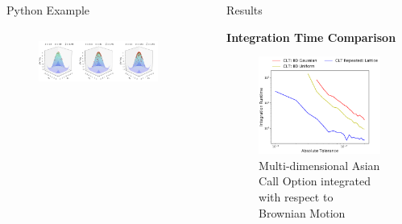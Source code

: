 \documentclass[final]{beamer}
\newcommand{\bfCenter}[1]{\centerline{\textbf{#1}}}
\newlength{\sepwid}
\newlength{\onecolwid}
\newlength{\twocolwid}
\newlength{\threecolwid}
\begin{document}
\begin{frame}[t]
\begin{columns}[t]
\begin{column}{\threecolwid}
\begin{column}{\threecolwid}\vspace{-.8in}
\begin{block}{Python Example}
    \begin{column}{\onecolwid}
        
    \end{column}
    \begin{column}{\twocolwid}
        \begin{figure}
            \includegraphics[width=0.98\textwidth]{Images/Three_3d_SurfaceScatters.png}
        \end{figure}
    \end{column}
\end{block}
\end{column}
\end{column}

\begin{column}{\sepwid}\end{column}
\begin{column}{\onecolwid}\vspace{-.3in}
\begin{block}{Results}
    \bfCenter{Integration Time Comparison}
    \begin{figure}
        \includegraphics[width=.8\textwidth]{Images/AbsTol_Runtime_LinePlot.png}
        \caption{Multi-dimensional Asian Call Option integrated with respect to  Brownian Motion}
    \end{figure}
\end{block}


\end{column}
\end{columns}
\end{frame}
\end{document}
